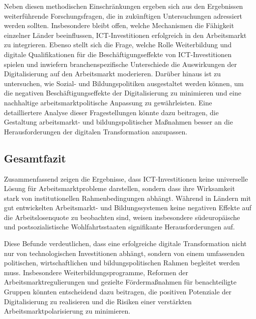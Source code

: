 Neben diesen methodischen Einschränkungen ergeben sich aus den Ergebnissen 
weiterführende Forschungsfragen, die in zukünftigen Untersuchungen adressiert 
werden sollten. Insbesondere bleibt offen, welche Mechanismen die Fähigkeit 
einzelner Länder beeinflussen, \ac{ICT}-Investitionen erfolgreich in den 
Arbeitsmarkt zu integrieren. Ebenso stellt sich die Frage, welche Rolle 
Weiterbildung und digitale Qualifikationen für die Beschäftigungseffekte von 
\ac{ICT}-Investitionen spielen und inwiefern branchenspezifische Unterschiede 
die Auswirkungen der Digitalisierung auf den Arbeitsmarkt moderieren. Darüber 
hinaus ist zu untersuchen, wie Sozial- und Bildungspolitiken ausgestaltet 
werden können, um die negativen Beschäftigungseffekte der Digitalisierung zu 
minimieren und eine nachhaltige arbeitsmarktpolitische Anpassung zu 
gewährleisten. Eine detailliertere Analyse dieser Fragestellungen könnte dazu 
beitragen, die Gestaltung arbeitsmarkt- und bildungspolitischer Maßnahmen besser 
an die Herausforderungen der digitalen Transformation anzupassen.


\subsection{Gesamtfazit}

Zusammenfassend zeigen die Ergebnisse, dass \ac{ICT}-Investitionen keine universelle 
Lösung für Arbeitsmarktprobleme darstellen, sondern dass ihre Wirksamkeit stark von 
institutionellen Rahmenbedingungen abhängt. Während in Ländern mit gut entwickelten 
Arbeitsmarkt- und Bildungssystemen keine negativen Effekte auf die Arbeitslosenquote 
zu beobachten sind, weisen insbesondere südeuropäische und postsozialistische 
Wohlfahrtsstaaten signifikante Herausforderungen auf. 

Diese Befunde verdeutlichen, dass eine erfolgreiche digitale Transformation nicht 
nur von technologischen Investitionen abhängt, sondern von einem umfassenden 
politischen, wirtschaftlichen und bildungspolitischen Rahmen begleitet werden muss. 
Insbesondere Weiterbildungsprogramme, Reformen der Arbeitsmarktregulierungen und 
gezielte Fördermaßnahmen für benachteiligte Gruppen könnten entscheidend dazu beitragen, 
die positiven Potenziale der Digitalisierung zu realisieren und die Risiken einer 
verstärkten Arbeitsmarktpolarisierung zu minimieren.
